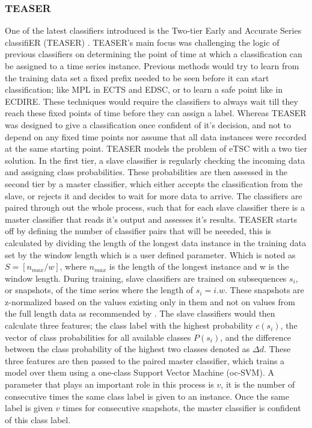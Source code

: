 \subsubsection{TEASER}
\label{SubsubsectionTEASER}
One of the latest classifiers introduced is the Two-tier Early and Accurate Series classifiER (TEASER) \cite{schafer2020teaser}.
TEASER's main focus was challenging the logic of previous classifiers on determining the point of time at which a classification can be assigned to a time series instance.
Previous methods would try to learn from the training data set a fixed prefix needed to be seen before it can start classification; like MPL in ECTS and EDSC, or to learn a safe point like in ECDIRE.
These techniques would require the classifiers to always wait till they reach these fixed points of time before they can assign a label.
Whereas TEASER was designed to give a classification once confident of it's decision, and not to depend on any fixed time points nor assume that all data instances were recorded
at the same starting point.
TEASER models the problem of eTSC with a two tier solution. In the first tier, a slave classifier is regularly checking the incoming data and assigning class probabilities.
These probabilities are then assessed in the second tier by a master classifier, which either accepts the classification from the slave, or rejects it and decides to wait for more data to arrive.
The classifiers are paired through out the whole process, such that for each slave classifier there is a master classifier that reads it's output and assesses it's results.
TEASER starts off by defining the number of classifier pairs that will be neeeded, this is calculated by dividing the length of the longest data instance in the training data set
by the window length which is a user defined parameter. Which is noted as $S = [n_{max}/w]$, where $n_{max}$ is the length of the longest instance and w is the window length.
During training, slave classifiers are trained on subsequences $s_{i}$, or snapshots, of the time series where the length of $s_{i} = i . w $. These snapshots are z-normalized based on
the values existing only in them and not on values from the full length data as recommended by \cite{mori2017early}.
The slave classifiers would then calculate three features; the class label with the highest probability $c(s_{i})$, the vector of class probabilities for all available classes $P(s_{i})$,
and the difference between the class probability of the highest two classes denoted as $\Delta d$.
These three features are then passed to the paired master classifier, which trains a model over them using a one-class Support Vector Machine (oc-SVM).
A parameter that plays an important role in this process is $v$, it is the number of consecutive times the same class label is given to an instance.
Once the same label is given $v$ times for consecutive snapshots, the master classifier is confident of this class label.